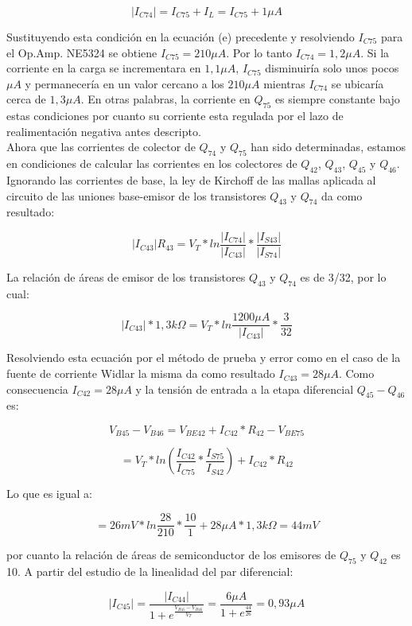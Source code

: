 \documentclass[12pt,a4paper,final,headinclude,footinclude,BCOR5mm]{scrartcl}
\begin{document}
$$|I_{C74}| = I_{C75} + I_{L} = I_{C75} + 1 \mu A$$

Sustituyendo esta condición en la ecuación (e) precedente y resolviendo $I_{C75}$ para el Op.Amp. NE5324 se obtiene $I_{C75} = 210 \mu A$. Por lo tanto $I_{C74} = 1,2 \mu A$. Si la corriente en la carga se incrementara en $1,1 \mu A$, $I_{C75}$ disminuiría solo unos pocos $\mu A$ y permanecería en un valor cercano a los $210 \mu A$ mientras $I_{C74}$ se ubicaría cerca de $1,3 \mu A$. En otras palabras, la corriente en $Q_{75}$ es siempre constante bajo estas condiciones por cuanto su corriente esta regulada por el lazo de realimentación negativa antes descripto.\\

Ahora que las corrientes de colector de $Q_{74}$ y $Q_{75}$ han sido determinadas, estamos en condiciones de calcular las corrientes en los colectores de $Q_{42}$, $Q_{43}$, $Q_{45}$ y $Q_{46}$. Ignorando las corrientes de base, la ley de Kirchoff de las mallas aplicada al circuito de las uniones base-emisor de los transistores $Q_{43}$ y $Q_{74}$ da como resultado:

$$|I_{C43}|R_{43} = V_{T}*ln \frac{|I_{C74}|}{|I_{C43}|} * \frac{|I_{S43}|}{|I_{S74}|}$$

La relación de áreas de emisor de los transistores $Q_{43}$ y $Q_{74}$ es de 3/32, por lo cual:

$$|I_{C43}|*1,3 k\Omega = V_{T}*ln \frac{1200 \mu A}{|I_{C43}|} * \frac{3}{32}$$

Resolviendo esta ecuación por el método de prueba y error como en el caso de la fuente de corriente Widlar la misma da como resultado $I_{C43} = 28 \mu A$. Como consecuencia $I_{C42} = 28 \mu A$ y la tensión de entrada a la etapa diferencial $Q_{45}-Q_{46}$ es:

$$V_{B45} - V_{B46} = V_{BE42} + I_{C42}*R_{42} - V_{BE75}$$

$$= V_{T} * ln (\frac{I_{C42}}{I_{C75}} * \frac{I_{S75}}{I_{S42}}) + I_{C42}*R_{42}$$

Lo que es igual a:

$$= 26 mV * ln \frac{28}{210}*\frac{10}{1} + 28 \mu A * 1,3 k\Omega = 44 mV$$

por cuanto la relación de áreas de semiconductor de los emisores de $Q_{75}$ y $Q_{42}$ es 10. A partir del estudio de la linealidad del par diferencial:

$$|I_{C45}| = \frac{|I_{C44}|}{1 + e^{\frac{V_{B45}-V_{B46}}{V_{T}}}} = \frac{6 \mu A}{1 + e^{\frac{44}{26}}} = 0,93 \mu A$$
\end{document}
